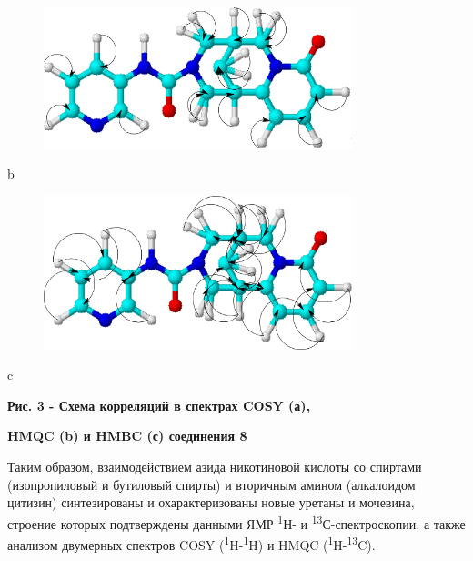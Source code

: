 \begin{figure}[H]
	\centering
	\includegraphics[width=0.8\textwidth]{assets/12}
	\caption*{}
\end{figure}b

\begin{figure}[H]
	\centering
	\includegraphics[width=0.8\textwidth]{assets/13}
	\caption*{}
\end{figure}c

{\bfseries Рис. 3 - Схема корреляций в спектрах COSY (а),}

{\bfseries HMQC (b) и HMBC (с) соединения 8}

Таким образом, взаимодействием азида никотиновой кислоты со спиртами
(изопропиловый и бутиловый спирты) и вторичным амином (алкалоидом
цитизин) синтезированы и охарактеризованы новые уретаны и мочевина,
строение которых подтверждены данными ЯМР \textsuperscript{1}Н- и
\textsuperscript{13}С-спектроскопии, а также анализом двумерных спектров
COSY (\textsuperscript{1}H-\textsuperscript{1}H) и HMQC
(\textsuperscript{1}H-\textsuperscript{13}C).

